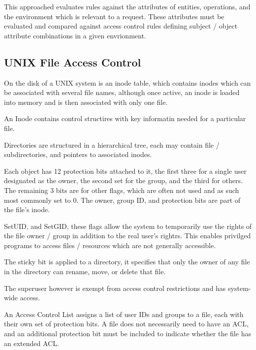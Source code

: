 This approached evaluates rules against the attributes of entities, operations, and the environment
which is relevant to a request. These attributes must be evaluated and compared against access control rules defining
subject / object attribute combinations in a given envrionment.

\subsection{UNIX File Access Control}
On the disk of a UNIX system is an inode table, which contains inodes which can be associated
with several file names, although once active, an inode is loaded into memory and is then associated with only one file.

An Inode contains control structires with key informatin needed for a particular file.

Directories are structured in a hierarchical tree, each may contain file / subdirectories, and pointers to associated inodes.

Each object has 12 protection bits attached to it, the first three for a single user designated as the owner, the second set for the group,
and the third for others. The remaining 3 bits are for other flags, which are often not used and as such most commonly set to 0.
The owner, group ID, and protection bits are part of the file's inode.

SetUID, and SetGID, these flags allow the system to temporarily use the rights of the file owner / group in addition to the real
user's rightrs. This enables privilged programs to access files / resources which are not generally accessible.

The sticky bit is applied to a directory, it specifies that only the owner of any file in the directory can rename, move, or delete that file.

The superuser however is exempt from access control restrictions and has system-wide access.

An Access Control List assigns a list of user IDs and groups to a file, each with their own set of protection bits.
A file does not necessarily need to have an ACL, and an additional protection bit must be included to indicate whether the file has an
extended ACL.